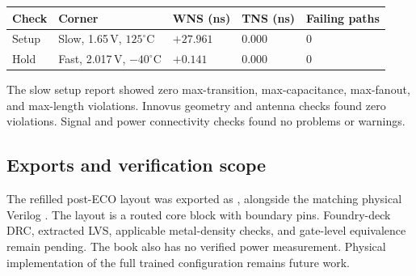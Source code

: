 {\smalltbl
\begin{tabularx}{\linewidth}{@{}P{24mm}YP{22mm}P{22mm}P{20mm}@{}}
\toprule
Check & Corner & WNS (ns) & TNS (ns) & Failing paths\\ \midrule
Setup & Slow, 1.65\,V, \(125^{\circ}\mathrm{C}\) & \(+27.961\) & 0.000 & 0\\
Hold & Fast, 2.017\,V, \(-40^{\circ}\mathrm{C}\) & \(+0.141\) & 0.000 & 0\\
\bottomrule
\end{tabularx}}

The slow setup report showed zero max-transition, max-capacitance, max-fanout, and max-length violations. Innovus geometry and antenna checks found zero violations. Signal and power connectivity checks found no problems or warnings.

\subsection{Exports and verification scope}
The refilled post-ECO layout was exported as , alongside the matching physical Verilog . The layout is a routed core block with boundary pins. Foundry-deck DRC, extracted LVS, applicable metal-density checks, and gate-level equivalence remain pending. The book also has no verified power measurement. Physical implementation of the full trained configuration remains future work.
\clearpage
